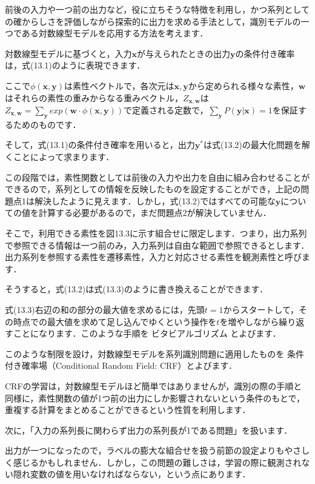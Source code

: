 
前後の入力や一つ前の出力など，役に立ちそうな特徴を利用し，かつ系列としての確からしさを評価しながら探索的に出力を求める手法として，識別モデルの一つである対数線型モデルを応用する方法を考えます．

対数線型モデルに基づくと，入力$\bm{x}$が与えられたときの出力$\bm{y}$の条件付き確率は，式(13.1)のように表現できます．

ここで$\phi(\bm{x}, \bm{y})$は素性ベクトルで，各次元は$\bm{x}, \bm{y}$から定められる様々な素性，$\bm{w}$はそれらの素性の重みからなる重みベクトル，$Z_{\bm{x},\bm{w}}$は$Z_{\bm{x},\bm{w}}=\sum_{\bm{y}} exp(\bm{w}\cdot\phi(\bm{x}, \bm{y}))$で定義される定数で，$\sum_{\bm{y}}P(\bm{y}|\bm{x})=1$を保証するためのものです．

そして，式(13.1)の条件付き確率を用いると，出力$\bm{y}^*$は式(13.2)の最大化問題を解くことによって求まります．

この段階では，素性関数としては前後の入力や出力を自由に組み合わせることができるので，系列としての情報を反映したものを設定することができ，上記の問題点1は解決したように見えます．しかし，式(13.2)ではすべての可能な$\bm{y}$についての値を計算する必要があるので，まだ問題点2が解決していません．


そこで，利用できる素性を図13.3に示す組合せに限定します．つまり，出力系列で参照できる情報は一つ前のみ，入力系列は自由な範囲で参照できるとします．出力系列を参照する素性を遷移素性，入力と対応させる素性を観測素性と呼びます．


そうすると，式(13.2)は式(13.3)のように書き換えることができます．

式(13.3)右辺の和の部分の最大値を求めるには，先頭$t=1$からスタートして，その時点での最大値を求めて足し込んでゆくという操作を$t$を増やしながら繰り返すことになります．このような手順を
ビタビアルゴリズム
とよびます．

このような制限を設け，対数線型モデルを系列識別問題に適用したものを
条件付き確率場（Conditional Random Field: CRF）とよびます．

CRFの学習は，対数線型モデルほど簡単ではありませんが，識別の際の手順と同様に，素性関数の値が1つ前の出力にしか影響されないという条件のもとで，重複する計算をまとめることができるという性質を利用します．


次に，「入力の系列長に関わらず出力の系列長が1である問題」を扱います．

出力が一つになったので，ラベルの膨大な組合せを扱う前節の設定よりもやさしく感じるかもしれません．しかし，この問題の難しさは，学習の際に観測されない隠れ変数の値を用いなければならない，という点にあります．

